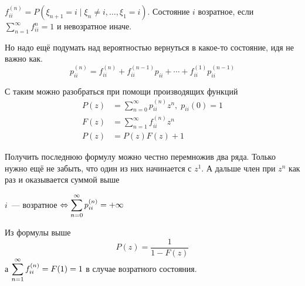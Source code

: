 \documentclass[12pt, timbord]{../../../notes}
\begin{document}
\begin{defn}\label{defn:proc::markchain::ret}
  $f_{ii}^{(n)} = P(\xi_{n+1} = i \mid \xi_{n} \neq i, \dotsc, \xi_1 = i) $. Состояние $i$
  возратное, если $\sum_{n=1}^\infty f_{ii}^n = 1$ и невозратное иначе.
\end{defn}

Но надо ещё подумать над вероятностью вернуться в какое-то состояние, идя не важно как.
\[
  p_{ii}^{(n)} = f_{ii}^{(n)} + f_{ii}^{(n-1)} p_{ii} + \dotsb + f_{ii}^{(1)}p_{ii}^{(n-1)}
\]

С таким можно разобраться при помощи производящих функций
\begin{align*}
  P(z) &= \sum_{n=0}^\infty p_{ii}^{(n)} z^n, \; p_{ii} (0) = 1 \\
  F(z) &= \sum_{n=1}^\infty f_{ii}^{(n)} z^n\\
  P(z) &= P(z) F(z) + 1 
\end{align*}

Получить последнюю формулу можно честно перемножив два ряда. Только нужно ещё не забыть, что один из
них начинается с $z^1$. А дальше член при $z^n$ как раз и оказывается суммой выше

\begin{prop}\label{prop:proc::markchain::retcrit}
  $i$~--- возратное $ \Leftrightarrow \displaystyle\sum_{n=0}^\infty p_{ii}^{(n)} = + \infty$
\end{prop}
\begin{itlproof}
  Из формулы выше
  \[
    P(z) = \frac{1}{1-F(z)}
  \]
  а $\displaystyle\sum_{n=1}^\infty f_{ii}^{(n)} = F(1) = 1$ в случае возратного состояния.
\end{itlproof}

\begin{defn}\label{defn:proc::markchain::}
  
\end{defn}
\end{document}
